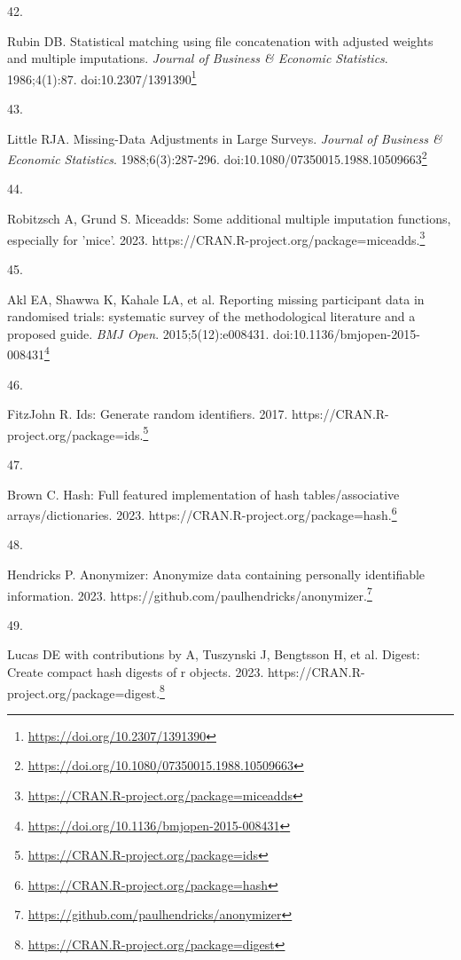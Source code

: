 \documentclass[
  a4paper,
]{book}
\newlength{\cslhangindent}
\newlength{\csllabelwidth}
\newlength{\cslentryspacingunit} %
\newenvironment{CSLReferences}[2] %
 {%
  \setlength{\parindent}{0pt}
  \ifodd #1
  \let\oldpar\par
  \def\par{\hangindent=\cslhangindent\oldpar}
  \fi
  \setlength{\parskip}{#2\cslentryspacingunit}
 }%
 {}
\newcommand{\CSLLeftMargin}[1]{\parbox[t]{\csllabelwidth}{#1}}
\newcommand{\CSLRightInline}[1]{\parbox[t]{\linewidth - \csllabelwidth}{#1}\break}
\renewcommand{\href}[2]{#2\footnote{\url{#1}}}
\begin{document}
\begin{CSLReferences}{0}{0}
\leavevmode{}%
\CSLLeftMargin{42. }%
\CSLRightInline{Rubin DB. Statistical matching using file concatenation with adjusted weights and multiple imputations. \emph{Journal of Business \& Economic Statistics}. 1986;4(1):87. doi:\href{https://doi.org/10.2307/1391390}{10.2307/1391390}}

\leavevmode{}%
\CSLLeftMargin{43. }%
\CSLRightInline{Little RJA. Missing-Data Adjustments in Large Surveys. \emph{Journal of Business \& Economic Statistics}. 1988;6(3):287-296. doi:\href{https://doi.org/10.1080/07350015.1988.10509663}{10.1080/07350015.1988.10509663}}

\leavevmode{}%
\CSLLeftMargin{44. }%
\CSLRightInline{Robitzsch A, Grund S. Miceadds: Some additional multiple imputation functions, especially for 'mice'. 2023. \href{https://CRAN.R-project.org/package=miceadds}{https://CRAN.R-project.org/package=miceadds.}}

\leavevmode{}%
\CSLLeftMargin{45. }%
\CSLRightInline{Akl EA, Shawwa K, Kahale LA, et al. Reporting missing participant data in randomised trials: systematic survey of the methodological literature and a proposed guide. \emph{BMJ Open}. 2015;5(12):e008431. doi:\href{https://doi.org/10.1136/bmjopen-2015-008431}{10.1136/bmjopen-2015-008431}}

\leavevmode{}%
\CSLLeftMargin{46. }%
\CSLRightInline{FitzJohn R. Ids: Generate random identifiers. 2017. \href{https://CRAN.R-project.org/package=ids}{https://CRAN.R-project.org/package=ids.}}

\leavevmode{}%
\CSLLeftMargin{47. }%
\CSLRightInline{Brown C. Hash: Full featured implementation of hash tables/associative arrays/dictionaries. 2023. \href{https://CRAN.R-project.org/package=hash}{https://CRAN.R-project.org/package=hash.}}

\leavevmode{}%
\CSLLeftMargin{48. }%
\CSLRightInline{Hendricks P. Anonymizer: Anonymize data containing personally identifiable information. 2023. \href{https://github.com/paulhendricks/anonymizer}{https://github.com/paulhendricks/anonymizer.}}

\leavevmode{}%
\CSLLeftMargin{49. }%
\CSLRightInline{Lucas DE with contributions by A, Tuszynski J, Bengtsson H, et al. Digest: Create compact hash digests of r objects. 2023. \href{https://CRAN.R-project.org/package=digest}{https://CRAN.R-project.org/package=digest.}}


\end{CSLReferences}
\end{document}
